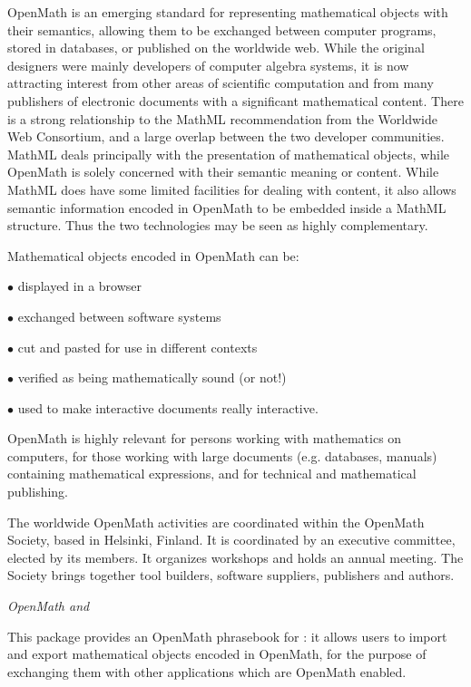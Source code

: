 OpenMath is an emerging standard for representing mathematical objects with their semantics, allowing them to be
exchanged between computer programs, stored in databases, or published on the worldwide web. While the original
designers were mainly developers of computer algebra systems, it is now attracting interest from other areas of scientific
computation and from many publishers of electronic documents with a significant mathematical content. There is a strong
relationship to the MathML recommendation from the Worldwide Web Consortium, and a large overlap between the two
developer communities. MathML deals principally with the presentation of mathematical objects, while OpenMath is solely
concerned with their semantic meaning or content. While MathML does have some limited facilities for dealing with content,
it also allows semantic information encoded in OpenMath to be embedded inside a MathML structure. Thus the two
technologies may be seen as highly complementary. 

Mathematical objects encoded in OpenMath can be:

\noindent 
$\bullet$ displayed in a browser 

\noindent
$\bullet$      exchanged between software systems 

\noindent
$\bullet$      cut and pasted for use in different contexts 

\noindent
$\bullet$  verified as being mathematically sound (or not!) 

\noindent
$\bullet$     used to make interactive documents really interactive. 

OpenMath is highly relevant for persons working with mathematics on computers, for those working with large documents
(e.g. databases, manuals) containing mathematical expressions, and for technical and mathematical publishing. 

The worldwide OpenMath activities are coordinated within the OpenMath Society, based in Helsinki, Finland. It is
coordinated by an executive committee, elected by its members. It organizes workshops and holds an annual meeting. The
Society brings together tool builders, software suppliers, publishers and authors. 

{\it  OpenMath and {\GAP}}

This package provides an OpenMath phrasebook for {\GAP}: 
it allows {\GAP} users to 
import and export mathematical objects encoded in OpenMath, 
for the purpose of exchanging them with other applications which 
are OpenMath enabled.

